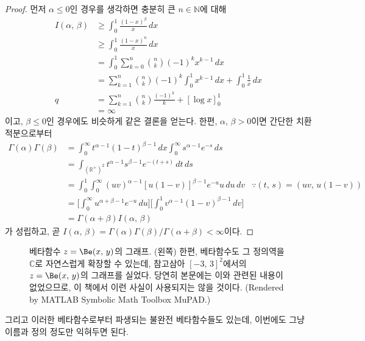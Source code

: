 \begin{proof}
    먼저 $\alpha\leq0$인 경우를 생각하면 충분히 큰 $n\in\mathbb{N}$에 대해
    \begin{align*}
        I(\alpha,\,\beta)&\geq\int_0^1\frac{(1-x)^\beta}{x}\,dx\\
        &\geq\int_0^1\frac{(1-x)^n}{x}\,dx\\
        &=\int_0^1\sum_{k=0}^n\binom{n}{k}(-1)^kx^{k-1}\,dx\\
        &=\sum_{k=1}^n\binom{n}{k}(-1)^k\int_0^1x^{k-1}\,dx+\int_0^1\frac{1}{x}\,dx\\q
        &=\sum_{k=1}^n\binom{n}{k}\frac{(-1)^k}{k}+[\log x]_0^1\\
        &=\infty
    \end{align*}
    이고, $\beta\leq0$인 경우에도 비슷하게 같은 결론을 얻는다. 한편, $\alpha,\,\beta>0$이면 간단한 치환적분으로부터
    \begin{align*}
        \Gamma(\alpha)\Gamma(\beta)&=\int_0^\infty t^{\alpha-1}(1-t)^{\beta-1}\,dx\int_0^\infty s^{\alpha-1}e^{-s}\,ds\\
        &=\int_{(\mathbb{R}^+)^2}t^{\alpha-1}s^{\beta-1}e^{-(t+s)}\,dt\,ds\\
        &=\int_0^1\int_0^\infty(uv)^{\alpha-1}[u(1-v)]^{\beta-1}e^{-u}u\,du\,dv&\because(t,\,s)=(uv,\,u(1-v))\\
        &=\bigg[\int_0^\infty u^{\alpha+\beta-1}e^{-u}\,du\bigg]\bigg[\int_0^1v^{\alpha-1}(1-v)^{\beta-1}\,dv\bigg]\\
        &=\Gamma(\alpha+\beta)I(\alpha,\,\beta)
    \end{align*}
    가 성립하고, 곧 $I(\alpha,\,\beta)=\Gamma(\alpha)\Gamma(\beta)/\Gamma(\alpha+\beta)<\infty$이다.
\end{proof}

\begin{figure}[!ht]
    \centering
    \caption{베타함수 $z=\Be(x,\,y)$의 그래프. (왼쪽) 한편, 베타함수도 그 정의역을 $\mathbb{C}$로 자연스럽게 확장할 수 있는데, 참고삼아 $[-3,\,3]^2$에서의 $z=\Be(x,\,y)$의 그래프를 실었다. 당연히 본문에는 이와 관련된 내용이 없었으므로, 이 책에서 이런 사실이 사용되지는 않을 것이다. (Rendered by MATLAB Symbolic Math Toolbox MuPAD.)}
\end{figure}

그리고 이러한 베타함수로부터 파생되는 불완전 베타함수들도 있는데, 이번에도 그냥 이름과 정의 정도만 익혀두면 된다.

